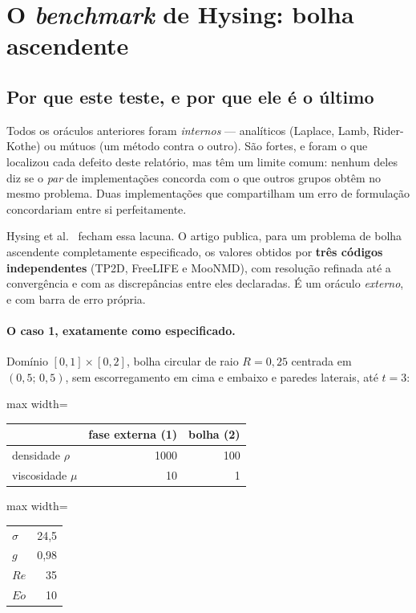 \section{O \emph{benchmark} de Hysing: bolha ascendente}
\label{sec:hysing}

\subsection{Por que este teste, e por que ele \'e o \'ultimo}

Todos os or\'aculos anteriores foram \emph{internos} --- anal\'iticos (Laplace,
Lamb, Rider-Kothe) ou m\'utuos (um m\'etodo contra o outro). S\~ao fortes, e
foram o que localizou cada defeito deste relat\'orio, mas t\^em um limite
comum: nenhum deles diz se o \emph{par} de implementa\c{c}\~oes concorda com o
que outros grupos obt\^em no mesmo problema. Duas implementa\c{c}\~oes que
compartilham um erro de formula\c{c}\~ao concordariam entre si perfeitamente.

Hysing et al.~\cite{hysing2009} fecham essa lacuna. O artigo publica, para um
problema de bolha ascendente completamente especificado, os valores obtidos por
\textbf{tr\^es c\'odigos independentes} (TP2D, FreeLIFE e MooNMD), com
resolu\c{c}\~ao refinada at\'e a converg\^encia e com as discrep\^ancias entre
eles declaradas. \'E um or\'aculo \emph{externo}, e com barra de erro pr\'opria.

\paragraph{O caso 1, exatamente como especificado.} Dom\'inio $[0,1]\times[0,2]$,
bolha circular de raio $R=0{,}25$ centrada em $(0{,}5;\,0{,}5)$, sem escorregamento
em cima e embaixo e paredes laterais, at\'e $t=3$:

\begin{center}
\begin{adjustbox}{max width=\linewidth}
\begin{tabular}{lrr}
\toprule
 & fase externa (1) & bolha (2) \\
\midrule
densidade $\rho$    & 1000 & 100 \\
viscosidade $\mu$   & 10   & 1   \\
\bottomrule
\end{tabular}
\end{adjustbox}
\qquad
\begin{adjustbox}{max width=\linewidth}
\begin{tabular}{lr}
\toprule
$\sigma$ & 24{,}5 \\
$g$      & 0{,}98 \\
$Re$     & 35 \\
$E\ddot{o}$ & 10 \\
\bottomrule
\end{tabular}
\end{adjustbox}
\end{center}

